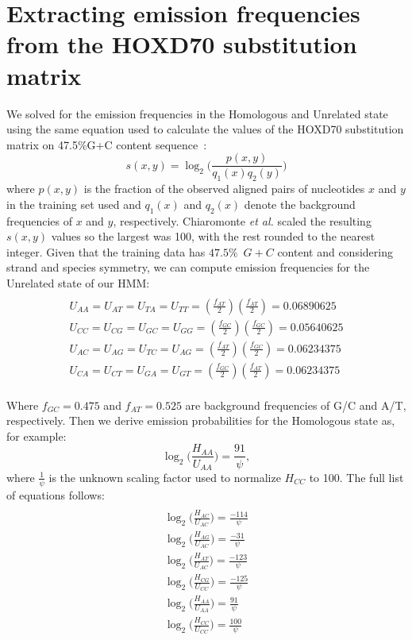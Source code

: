 \documentclass[10pt,journal,letterpaper,compsoc,peerreview]{IEEEtran}
\begin{document}
\section{Extracting emission frequencies from the HOXD70 substitution matrix}
We solved for the emission frequencies in the
Homologous and Unrelated state using the same equation used to
calculate the values of the HOXD70 substitution matrix on 47.5\%G+C
content sequence~\cite{hoxd}:
\begin{equation}
s(x,y)= \log_{2}{\Bigg(\frac{p(x,y)}{q_{1}(x)q_{2}(y)}\Bigg)}
\end{equation}
{w}here $p(x,y)$ is the fraction of the observed aligned pairs of
nucleotides $x$ and $y$ in the training set used and $q_{1}(x)$ and
$q_{2}(x)$ denote the background frequencies of $x$ and $y$,
respectively. Chiaromonte \textit{et al.} scaled the resulting
$s(x,y)$ values so the largest was 100,
with the rest rounded to the nearest integer.  Given that the training
data has $47.5\%$~$G+C$ content and considering strand and species
symmetry, we can compute emission frequencies for the Unrelated state
of our HMM:
\begin{multline}\\
U_{AA}=U_{AT}=U_{TA}=U_{TT}=(\frac{f_{AT}}{2})(\frac{f_{AT}}{2})
= 0.06890625 \\
U_{CC}=U_{CG}=U_{GC}=U_{GG}=(\frac{f_{GC}}{2})(\frac{f_{GC}}{2}) =
0.05640625 \\
U_{AC}=U_{AG}=U_{TC}=U_{AG}=(\frac{f_{AT}}{2})(\frac{f_{GC}}{2}) =
0.06234375 \\
U_{CA}=U_{CT}=U_{GA}=U_{GT}=(\frac{f_{GC}}{2})(\frac{f_{AT}}{2}) =
0.06234375 \\
\end{multline}

Where $f_{GC}=0.475$ and $f_{AT}=0.525$ are background frequencies of
G/C and A/T, respectively.  Then we derive emission probabilities for
the Homologous state as, for example:
\begin{equation}
\log_{2}\bigg(\frac{H_{AA}}{U_{AA}}\bigg) = \frac{91}{\psi},
\end{equation}
where $\frac{1}{\psi}$ is the unknown scaling factor used to normalize $H_{CC}$ to 100. The full list of equations follows:
\begin{multline}\\
\log_{2}\bigg(\frac{H_{AC}}{U_{AC}}\bigg) = \frac{-114}{\psi}\\
\log_{2}\bigg(\frac{H_{AG}}{U_{AC}}\bigg) = \frac{-31}{\psi}\\
\log_{2}\bigg(\frac{H_{AT}}{U_{AC}}\bigg) = \frac{-123}{\psi}\\
\log_{2}\bigg(\frac{H_{CG}}{U_{CC}}\bigg) = \frac{-125}{\psi}\\
\log_{2}\bigg(\frac{H_{AA}}{U_{AA}}\bigg) = \frac{91}{\psi}\\
\log_{2}\bigg(\frac{H_{CC}}{U_{CC}}\bigg) = \frac{100}{\psi}\\
\end{multline}
\end{document}
